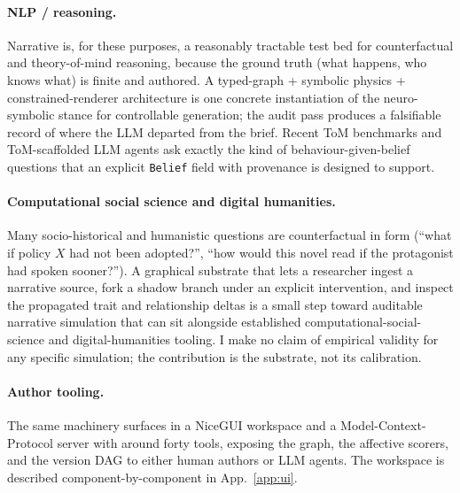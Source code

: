 \documentclass[11pt]{article}
\begin{document}
\paragraph{NLP / reasoning.} Narrative is, for these purposes, a
reasonably tractable test bed for counterfactual and
theory-of-mind reasoning, because the ground truth (what happens,
who knows what) is finite and authored. A typed-graph + symbolic
physics + constrained-renderer architecture is one concrete
instantiation of the neuro-symbolic stance for controllable
generation; the audit pass produces a falsifiable record of
where the LLM departed from the brief. Recent ToM benchmarks
\citep{gu2026simpletom,kim2023fantom} and ToM-scaffolded LLM
agents \citep{cross2024hyp} ask exactly
the kind of behaviour-given-belief questions that an explicit
\texttt{Belief} field with provenance is designed to support.

\paragraph{Computational social science and digital humanities.}
Many socio-historical and humanistic questions are counterfactual
in form (``what if policy $X$ had not been adopted?'', ``how
would this novel read if the protagonist had spoken sooner?''). A
graphical substrate that lets a researcher ingest a narrative
source, fork a shadow branch under an explicit intervention, and
inspect the propagated trait and relationship deltas is a small
step toward auditable narrative simulation that can sit alongside
established computational-social-science
\citep{lazer2009css} and digital-humanities tooling. I make no
claim of empirical validity for any specific simulation; the
contribution is the substrate, not its calibration.

\paragraph{Author tooling.} The same machinery surfaces in a
NiceGUI workspace and a Model-Context-Protocol server with around
forty tools, exposing the graph, the affective scorers, and the
version DAG to either human authors or LLM agents. The workspace
is described component-by-component in App.~\ref{app:ui}.
\end{document}
